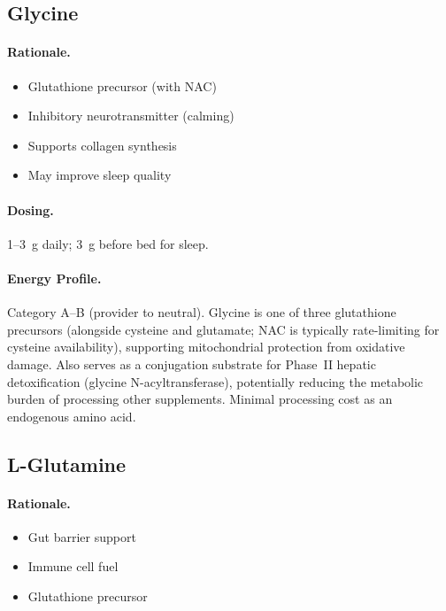 \subsection{Glycine}

\paragraph{Rationale.}
\begin{itemize}
    \item Glutathione precursor (with NAC)
    \item Inhibitory neurotransmitter (calming)
    \item Supports collagen synthesis
    \item May improve sleep quality
\end{itemize}

\paragraph{Dosing.} 1--3~g daily; 3~g before bed for sleep.

\paragraph{Energy Profile.}
Category A--B (provider to neutral). Glycine is one of three glutathione precursors (alongside cysteine and glutamate; NAC is typically rate-limiting for cysteine availability), supporting mitochondrial protection from oxidative damage. Also serves as a conjugation substrate for Phase~II hepatic detoxification (glycine N-acyltransferase), potentially reducing the metabolic burden of processing other supplements. Minimal processing cost as an endogenous amino acid.

\subsection{L-Glutamine}

\paragraph{Rationale.}
\begin{itemize}
    \item Gut barrier support
    \item Immune cell fuel
    \item Glutathione precursor
\end{itemize}

